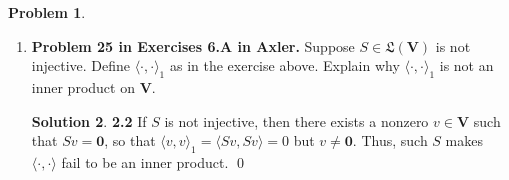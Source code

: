 \documentclass{article}
\theoremstyle{definition}
\newtheorem*{prob*}{Problem}
\newtheorem*{sln*}{Solution}
\newcommand{\V}{\mathbf{V}}
\newcommand{\LL}{\mathfrak{L}}
\newcommand{\la}{\langle}
\newcommand{\ra}{\rangle}
\begin{document}
\begin{prob*}
\begin{enumerate}
\begin{sln*}
\begin{enumerate}
				\item \textbf{Additivity in first slot: }Let $u,w,v \in \V$ be given, then 
				\begin{align*}
				\la u+w ,v \ra_1 &= \la S(u+w), Sv \ra \\&= \la Su + Sw , Sv \ra \\
				&= \la Su, Sv \ra + \la Sw, Sv \ra \\
				&= \la u,v \ra_1 + \la w,v \ra_1,
				\end{align*}
				where the third equality is due to $\la \cdot, \cdot \ra$ being an inner product on $V$.
				\item \textbf{Homogeneity in first slot: }
				\begin{align*}
				\la \alpha u,v \ra_1 = \la S(\alpha u), Sv \ra = \la \alpha Su, Sv \ra = \alpha \la Su, Sv\ra = \alpha\la u,v\ra_1,
				\end{align*}
				where the last equality is due to $\la \cdot, \cdot \ra$ being an inner product on $V$.
				\item \textbf{Conjugate symmetry: }
				\begin{align*}
				\overline{\la v,u \ra}_1 = \overline{\la Sv, Su \ra} = \la Su, Sv \ra = \la u ,v\ra_1, 
				\end{align*}
				where the second equality is due to $\la \cdot, \cdot \ra$ being an inner product on $V$.
			\end{enumerate}\qed
		\end{sln*}
		
		
		
		
		
		
		\item \textbf{Problem 25 in Exercises 6.A in Axler.} Suppose $S \in \LL(\V)$ is not injective. Define $\la \cdot , \cdot \ra_1$ as in the exercise above. Explain why $\la \cdot, \cdot\ra_1$ is not an inner product on $\V$.
		
		\begin{sln*}\textbf{2.2} 
			If $S$ is not injective, then there exists a nonzero $v\in \V$ such that $Sv = \mathbf{0}$, so that $\la v,v \ra_1 = \la Sv, Sv \ra = 0$ but $v \neq \mathbf{0}$. Thus, such $S$ makes $\la \cdot, \cdot \ra$ fail to be an inner product. \qed
			
		\end{sln*}
		
		
	\end{enumerate}
	
\end{prob*}
\end{document}
